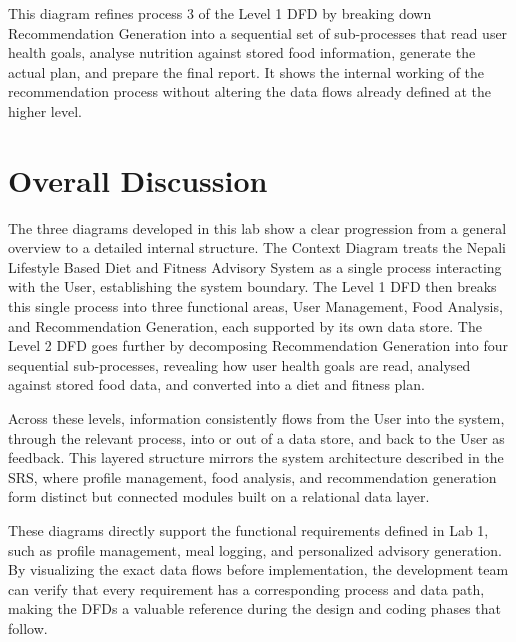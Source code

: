 \documentclass[12pt,a4paper]{report}
\begin{document}
This diagram refines process 3 of the Level 1 DFD by breaking down Recommendation Generation
into a sequential set of sub-processes that read user health goals, analyse nutrition against
stored food information, generate the actual plan, and prepare the final report. It shows the
internal working of the recommendation process without altering the data flows already defined
at the higher level.

\chapter{Overall Discussion}

The three diagrams developed in this lab show a clear progression from a general overview to a
detailed internal structure. The Context Diagram treats the Nepali Lifestyle Based Diet and
Fitness Advisory System as a single process interacting with the User, establishing the system
boundary. The Level 1 DFD then breaks this single process into three functional areas, User
Management, Food Analysis, and Recommendation Generation, each supported by its own data store.
The Level 2 DFD goes further by decomposing Recommendation Generation into four sequential
sub-processes, revealing how user health goals are read, analysed against stored food data, and
converted into a diet and fitness plan.

Across these levels, information consistently flows from the User into the system, through the
relevant process, into or out of a data store, and back to the User as feedback. This layered
structure mirrors the system architecture described in the SRS, where profile management, food
analysis, and recommendation generation form distinct but connected modules built on a
relational data layer.

These diagrams directly support the functional requirements defined in Lab 1, such as profile
management, meal logging, and personalized advisory generation. By visualizing the exact data
flows before implementation, the development team can verify that every requirement has a
corresponding process and data path, making the DFDs a valuable reference during the design and
coding phases that follow.

\end{document}
